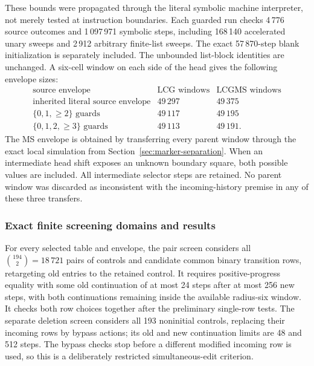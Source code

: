 These bounds were propagated through the literal symbolic machine
interpreter, not merely tested at instruction boundaries.  Each guarded
run checks 4\,776 source outcomes and 1\,097\,971 symbolic steps, including
168\,140 accelerated unary sweeps and 2\,912 arbitrary finite-list sweeps.
The exact 57\,870-step blank initialization is separately included.  The
unbounded list-block identities are unchanged.  A six-cell window on each
side of the head gives the following envelope sizes:
\[
\begin{array}{lrr}
\text{source envelope}&\text{LCG windows}&\text{LCGMS windows}\\\hline
\text{inherited literal source envelope}&49\,297&49\,375\\
\{0,1,{\geq}2\}\text{ guards}&49\,117&49\,195\\
\{0,1,2,{\geq}3\}\text{ guards}&49\,113&49\,191.
\end{array}
\]
The MS envelope is obtained by transferring every parent window through
the exact local simulation from Section~\ref{sec:marker-separation}.
When an intermediate head shift exposes an unknown boundary square,
both possible values are included.  All intermediate selector steps
are retained.  No parent window was discarded as inconsistent with the
incoming-history premise in any of these three transfers.

\subsubsection{Exact finite screening domains and results}
For every selected table and envelope, the pair screen considers all
$\binom{194}{2}=18\,721$ pairs of controls and candidate common binary
transition rows, retargeting old entries to the retained control.  It
requires positive-progress equality with some old continuation of at most
24 steps after at most 256 new steps, with both continuations remaining
inside the available radius-six window.  It checks both row choices
together after the preliminary single-row tests.  The separate deletion
screen considers all 193 noninitial controls, replacing their incoming
rows by bypass actions; its old and new continuation limits are 48 and
512 steps.  The bypass checks stop before a different modified incoming
row is used, so this is a deliberately restricted simultaneous-edit
criterion.

